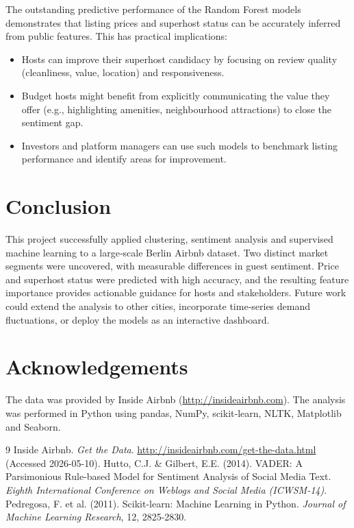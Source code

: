 \documentclass[11pt,a4paper]{article}
\begin{document}
The outstanding predictive performance of the Random Forest models demonstrates that listing prices and superhost status can be accurately inferred from public features. This has practical implications:
\begin{itemize}
    \item Hosts can improve their superhost candidacy by focusing on review quality (cleanliness, value, location) and responsiveness.
    \item Budget hosts might benefit from explicitly communicating the value they offer (e.g., highlighting amenities, neighbourhood attractions) to close the sentiment gap.
    \item Investors and platform managers can use such models to benchmark listing performance and identify areas for improvement.
\end{itemize}

\section{Conclusion}
This project successfully applied clustering, sentiment analysis and supervised machine learning to a large‑scale Berlin Airbnb dataset. Two distinct market segments were uncovered, with measurable differences in guest sentiment. Price and superhost status were predicted with high accuracy, and the resulting feature importance provides actionable guidance for hosts and stakeholders. Future work could extend the analysis to other cities, incorporate time‑series demand fluctuations, or deploy the models as an interactive dashboard.

\section*{Acknowledgements}
The data was provided by Inside Airbnb (\url{http://insideairbnb.com}). The analysis was performed in Python using pandas, NumPy, scikit‑learn, NLTK, Matplotlib and Seaborn.

\begin{thebibliography}{9}
Inside Airbnb. \textit{Get the Data}. \url{http://insideairbnb.com/get-the-data.html} (Accessed 2026-05-10).
 Hutto, C.J. \& Gilbert, E.E. (2014). VADER: A Parsimonious Rule-based Model for Sentiment Analysis of Social Media Text. \textit{Eighth International Conference on Weblogs and Social Media (ICWSM-14)}.
 Pedregosa, F. et al. (2011). Scikit-learn: Machine Learning in Python. \textit{Journal of Machine Learning Research}, 12, 2825-2830.
\end{thebibliography}

\end{document}

